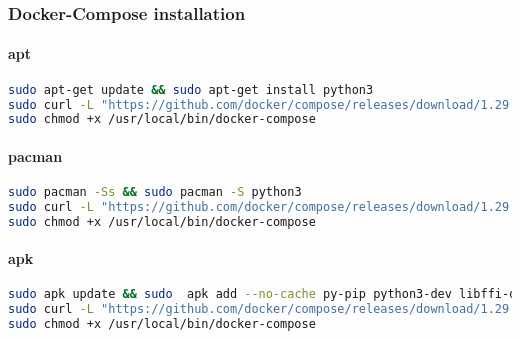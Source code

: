 \subsubsection{Docker-Compose installation}
\paragraph{apt} \begin{lstlisting}[language=bash,label={lst:apt-compose}]
sudo apt-get update && sudo apt-get install python3
sudo curl -L "https://github.com/docker/compose/releases/download/1.29.2/docker-compose-$(uname -s)-$(uname -m)" -o /usr/local/bin/docker-compose
sudo chmod +x /usr/local/bin/docker-compose
\end{lstlisting}

\paragraph{pacman} \begin{lstlisting}[language=bash,label={lst:pacman-compose}]
sudo pacman -Ss && sudo pacman -S python3
sudo curl -L "https://github.com/docker/compose/releases/download/1.29.2/docker-compose-$(uname -s)-$(uname -m)" -o /usr/local/bin/docker-compose
sudo chmod +x /usr/local/bin/docker-compose
\end{lstlisting}

\paragraph{apk} \begin{lstlisting}[language=bash,label={lst:apk-compose}]
sudo apk update && sudo  apk add --no-cache py-pip python3-dev libffi-dev openssl-dev gcc libc-dev rust cargo make
sudo curl -L "https://github.com/docker/compose/releases/download/1.29.2/docker-compose-$(uname -s)-$(uname -m)" -o /usr/local/bin/docker-compose
sudo chmod +x /usr/local/bin/docker-compose
\end{lstlisting}